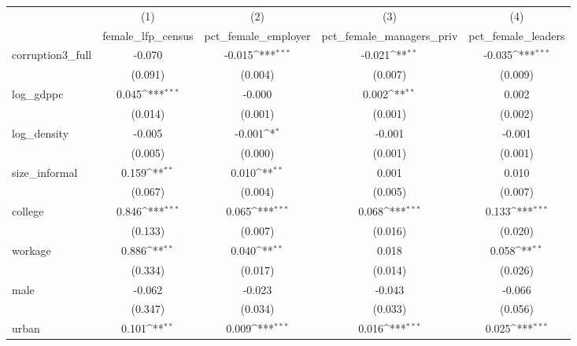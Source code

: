 {
\def\sym#1{\ifmmode^{#1}\else\(^{#1}\)\fi}
\begin{tabular}{l*{4}{c}}
\hline\hline
            &\multicolumn{1}{c}{(1)}&\multicolumn{1}{c}{(2)}&\multicolumn{1}{c}{(3)}&\multicolumn{1}{c}{(4)}\\
            &\multicolumn{1}{c}{female\_lfp\_census}&\multicolumn{1}{c}{pct\_female\_employer}&\multicolumn{1}{c}{pct\_female\_managers\_priv}&\multicolumn{1}{c}{pct\_female\_leaders}\\
\hline
corruption3\_full&      -0.070         &      -0.015\sym{***}&      -0.021\sym{**} &      -0.035\sym{***}\\
            &     (0.091)         &     (0.004)         &     (0.007)         &     (0.009)         \\
[1em]
log\_gdppc   &       0.045\sym{***}&      -0.000         &       0.002\sym{**} &       0.002         \\
            &     (0.014)         &     (0.001)         &     (0.001)         &     (0.002)         \\
[1em]
log\_density &      -0.005         &      -0.001\sym{*}  &      -0.001         &      -0.001         \\
            &     (0.005)         &     (0.000)         &     (0.001)         &     (0.001)         \\
[1em]
size\_informal&       0.159\sym{**} &       0.010\sym{**} &       0.001         &       0.010         \\
            &     (0.067)         &     (0.004)         &     (0.005)         &     (0.007)         \\
[1em]
college     &       0.846\sym{***}&       0.065\sym{***}&       0.068\sym{***}&       0.133\sym{***}\\
            &     (0.133)         &     (0.007)         &     (0.016)         &     (0.020)         \\
[1em]
workage     &       0.886\sym{**} &       0.040\sym{**} &       0.018         &       0.058\sym{**} \\
            &     (0.334)         &     (0.017)         &     (0.014)         &     (0.026)         \\
[1em]
male        &      -0.062         &      -0.023         &      -0.043         &      -0.066         \\
            &     (0.347)         &     (0.034)         &     (0.033)         &     (0.056)         \\
[1em]
urban       &       0.101\sym{**} &       0.009\sym{***}&       0.016\sym{***}&       0.025\sym{***}\\

\end{tabular}}
